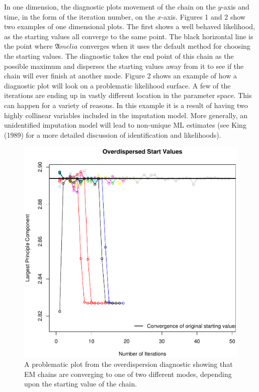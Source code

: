 \documentclass[12pt,titlepage]{article}
\newcommand{\Amelia}{\ensuremath{\mathfrak Amelia} }
\begin{document}
In one dimension, the diagnostic plots movement of the chain on the
$y$-axis and time, in the form of the iteration number, on the
$x$-axis.  Figures 1 and 2 show two examples of one dimensional plots.
The first shows a well behaved likelihood, as the starting values all
converge to the same point.  The black horizontal line is the point
where \Amelia converges when it uses the default method for choosing
the starting values.  The diagnostic takes the end point of this chain
as the possible maximum and disperses the starting values away from it
to see if the chain will ever finish at another mode.  Figure 2 shows
an example of how a diagnostic plot will look on a problematic
likelihood surface.  A few of the iterations are ending up in vastly
different location in the parameter space.  This can happen for a
variety of reasons.  In this example it is a result of having two
highly collinear variables included in the imputation model.  More
generally, an unidentified imputation model will lead to non-unique ML
estimates (see King (1989) for a more detailed discussion of
identification and likelihoods).
\begin{figure}
  \centering \includegraphics[scale=.5]{disperse-bad}
  \caption{ A problematic plot from the overdispersion diagnostic
    showing that EM chains are converging to one of two different
    modes, depending upon the starting value of the chain.}
\end{figure}
\end{document}
